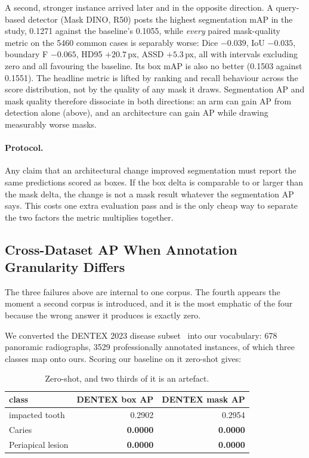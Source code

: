 \documentclass[10pt,twocolumn,letterpaper]{article}
\begin{document}
A second, stronger instance arrived later and in the opposite direction. A
query-based detector (Mask DINO, R50) posts the highest segmentation mAP in
the study, 0.1271 against the baseline's 0.1055, while \emph{every} paired
mask-quality metric on the 5460 common cases is separably worse: Dice
$-0.039$, IoU $-0.035$, boundary F $-0.065$, HD95 $+20.7$\,px, ASSD
$+5.3$\,px, all with intervals excluding zero and all favouring the baseline.
Its box mAP is also no better (0.1503 against 0.1551). The headline metric is
lifted by ranking and recall behaviour across the score distribution, not by
the quality of any mask it draws. Segmentation AP and mask quality therefore
dissociate in both directions: an arm can gain AP from detection alone
(above), and an architecture can gain AP while drawing measurably worse masks.

\paragraph{Protocol.} Any claim that an architectural change improved
segmentation must report the same predictions scored as boxes. If the box delta
is comparable to or larger than the mask delta, the change is not a mask result
whatever the segmentation AP says. This costs one extra evaluation pass and is
the only cheap way to separate the two factors the metric multiplies together.

\subsection{Cross-Dataset AP When Annotation Granularity Differs}
\label{sec:granularity}

The three failures above are internal to one corpus. The fourth appears the
moment a second corpus is introduced, and it is the most emphatic of the four
because the wrong answer it produces is exactly zero.

We converted the DENTEX 2023 disease subset~\cite{hamamci2023dentex} into our
vocabulary: 678 panoramic radiographs, 3529 professionally annotated instances,
of which three classes map onto ours. Scoring our baseline on it zero-shot
gives:

\begin{table}[h]
\centering\small
\begin{tabular}{lrr}
\toprule
class & DENTEX box AP & DENTEX mask AP \\
\midrule
impacted tooth & 0.2902 & 0.2954 \\
Caries & \textbf{0.0000} & \textbf{0.0000} \\
Periapical lesion & \textbf{0.0000} & \textbf{0.0000} \\
\bottomrule
\end{tabular}
\caption{Zero-shot, and two thirds of it is an artefact.}
\end{table}
\end{document}
